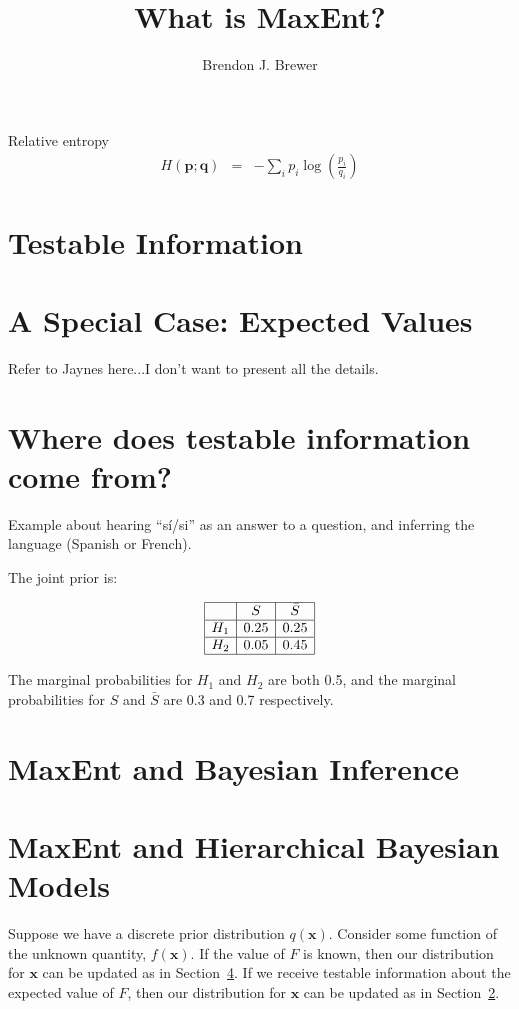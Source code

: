 \documentclass[letterpaper, 11pt]{article}
\title{What is MaxEnt?}
\author{Brendon J. Brewer}
\newcommand{\xx}{\boldsymbol{x}}
\begin{document}
\maketitle



Relative entropy
\begin{eqnarray}
H(\boldsymbol{p}; \boldsymbol{q}) &=& -\sum_i p_i \log\left(\frac{p_i}{q_i}\right) 
\end{eqnarray}

\section{Testable Information}

\section{A Special Case: Expected Values}\label{sec:expectations}
Refer to Jaynes here...I don't want to present all the details.

\section{Where does testable information come from?}

Example about hearing ``sí/si'' as an answer to a question,
and inferring the language (Spanish or French).

The joint prior is:

\begin{eqnarray}
\begin{array}{|c|c|c|}
\hline
	&	S	& \bar{S}\\
\hline
H_1 & 0.25  & 0.25\\
\hline
H_2 & 0.05 & 0.45\\
\hline
\end{array}
\end{eqnarray}

The marginal probabilities for $H_1$ and $H_2$ are both 0.5, and the
marginal probabilities for $S$ and $\bar{S}$ are 0.3 and 0.7 respectively.


\section{MaxEnt and Bayesian Inference}\label{sec:bayes}

\section{MaxEnt and Hierarchical Bayesian Models}
Suppose we have a discrete prior distribution $q(\xx)$. Consider some
function of the unknown quantity, $f(\xx)$.
If the value of $F$ is known, then our distribution for $\xx$ can
be updated as in Section~\ref{sec:bayes}. If we receive testable information
about the expected value of $F$, then our distribution for $\xx$ can
be updated as in Section~\ref{sec:expectations}.
\end{document}
